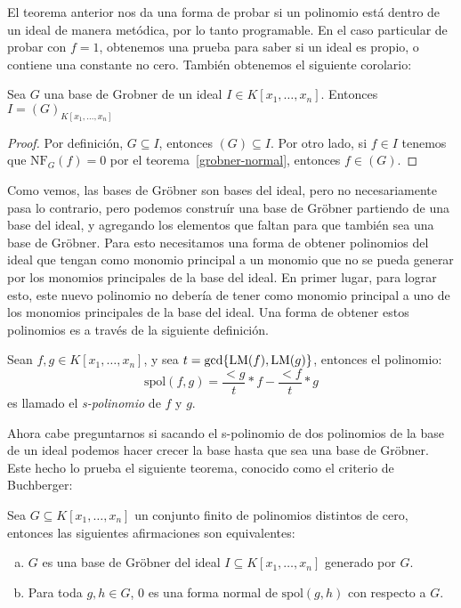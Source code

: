 El teorema anterior nos da una forma de probar si un polinomio está dentro de un ideal de manera metódica, por lo tanto programable. En el caso particular de probar con $f = 1$, obtenemos una prueba para saber si un ideal es propio, o contiene una constante no cero. También obtenemos el siguiente corolario:

\begin{corollary}
Sea $G$ una base de Grobner de un ideal $I \in K[x_1,\dots,x_n]$. Entonces $I = (G)_{K[x_1, \dots, x_n]}$
\end{corollary}

\begin{proof}
Por definición, $G \subseteq I$, entonces $(G) \subseteq I$. Por otro lado, si $f \in I$ tenemos que $\textrm{NF}_G(f) = 0$ por el teorema~\ref{grobner-normal}, entonces $f \in (G)$.
\end{proof}

Como vemos, las bases de Gröbner son bases del ideal, pero no necesariamente pasa lo contrario, pero podemos construír una base de Gröbner partiendo de una base del ideal, y agregando los elementos que faltan para que también sea una base de Gröbner. Para esto necesitamos una forma de obtener polinomios del ideal que tengan como monomio principal a un monomio que no se pueda generar por los monomios principales de la base del ideal. En primer lugar, para lograr esto, este nuevo polinomio no debería de tener como monomio principal a uno de los monomios principales de la base del ideal. Una forma de obtener estos polinomios es a través de la siguiente definición.

\begin{definition}
Sean $f, g \in K[x_1,\dots,x_n]$, y sea $t = \gcd\{\textrm{LM}(f),\textrm{LM}(g)\}$, entonces el polinomio:
$$ \textrm{spol}(f,g) = \frac{\lt{g}}{t}*f - \frac{\lt{f}}{t}*g $$
es llamado el \emph{s-polinomio} de $f$ y $g$.
\end{definition}

Ahora cabe preguntarnos si sacando el s-polinomio de dos polinomios de la base de un ideal podemos hacer crecer la base hasta que sea una base de Gröbner. Este hecho lo prueba el siguiente teorema, conocido como el criterio de Buchberger:

\begin{theorem}
Sea $G \subseteq K[x_1,\dots,x_n]$ un conjunto finito de polinomios distintos de cero, entonces las siguientes afirmaciones son equivalentes:
\begin{enumerate}[(a)]
\item $G$ es una base de Gröbner del ideal $I \subseteq K[x_1,\dots, x_n]$ generado por $G$.
\item Para toda $g, h \in G$, 0 es una forma normal de $\textrm{spol}(g,h)$ con respecto a $G$.
\end{enumerate}
\end{theorem}

